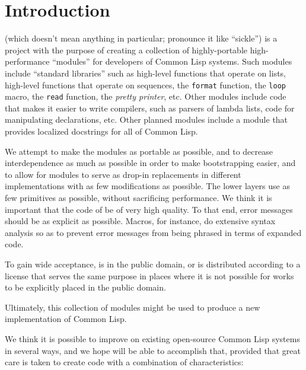 \chapter{Introduction}
%

\sysname{} (which doesn't mean anything in particular; pronounce it
like ``sickle'') is a project with the purpose of creating a
collection of highly-portable high-performance ``modules'' for
developers of Common Lisp systems.  Such modules include ``standard
libraries'' such as high-level functions that operate on lists,
high-level functions that operate on sequences, the \texttt{format}
function, the \texttt{loop} macro, the \texttt{read} function, the
\emph{pretty printer}, etc.  Other modules include code that makes it
easier to write compilers, such as parsers of lambda lists, code for
manipulating declarations, etc.  Other planned modules include a
module that provides localized docstrings for all of Common Lisp.

We attempt to make the modules as portable as possible, and to
decrease interdependence as much as possible in order to make
bootstrapping easier, and to allow for modules to serve as drop-in
replacements in different implementations with as few modifications as
possible.  The lower layers use as few primitives as possible, without
sacrificing performance.  We think it is important that the code of
\sysname{} be of very high quality.  To that end, error messages
should be as explicit as possible.  Macros, for instance, do extensive
syntax analysis so as to prevent error messages from being phrased in
terms of expanded code.

To gain wide acceptance, \sysname{} is in the public domain, or is
distributed according to a license that serves the same purpose in
places where it is not possible for works to be explicitly placed in
the public domain.

Ultimately, this collection of modules might be used to produce a new
implementation of Common Lisp.  

We think it is possible to improve on existing open-source Common Lisp
systems in several ways, and we hope \sysname{} will be able to
accomplish that, provided that great care is taken to create code with
a combination of characteristics:

